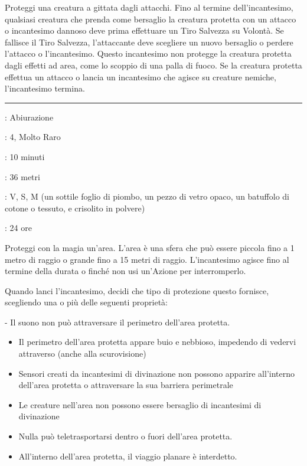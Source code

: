 \begin{multicols}{2}
Proteggi una creatura a gittata dagli attacchi. Fino al termine dell'incantesimo, qualsiasi creatura che prenda come bersaglio la creatura protetta con un attacco o incantesimo dannoso deve prima effettuare un Tiro Salvezza su Volontà. Se fallisce il Tiro Salvezza, l'attaccante deve scegliere un nuovo bersaglio o perdere l'attacco o l'incantesimo. Questo incantesimo non protegge la creatura protetta dagli effetti ad area, come lo scoppio di una palla di fuoco. Se la creatura protetta effettua un attacco o lancia un incantesimo che agisce su creature nemiche, l'incantesimo termina.

\smallskip\noindent\rule{\linewidth}{2pt} \hypertarget{Santuario Privato}{}\medskip{}
\noindent
\begin{description}[noitemsep, topsep=0pt, parsep=0pt, partopsep=0pt, leftmargin=0cm, labelwidth=2.8cm]
	\item[\textbf{Lista di Magia}]: Abiurazione
	\item[\textbf{Livello}]: 4, Molto Raro
	\item[\textbf{T. di Lancio}]: 10 minuti
	\item[\textbf{Gittata}]: 36 metri
	\item[\textbf{Componenti}]: V, S, M (un sottile foglio di piombo, un pezzo di vetro opaco, un batuffolo di cotone o tessuto, e crisolito in polvere)
	\item[\textbf{Durata}]: 24 ore
\end{description}

Proteggi con la magia un'area. L'area è una sfera che può essere piccola fino a 1 metro di raggio o grande fino a 15 metri di raggio. L'incantesimo agisce fino al termine della durata o finché non usi un'Azione per interromperlo.

Quando lanci l'incantesimo, decidi che tipo di protezione questo fornisce, scegliendo una o più delle seguenti proprietà:

\noindent- Il suono non può attraversare il perimetro dell'area protetta.

\begin{itemize}[leftmargin=*] \setlength{\itemsep}{0pt}
	\item Il perimetro dell'area protetta appare buio e nebbioso, impedendo di vedervi attraverso (anche alla scurovisione)
	\item Sensori creati da incantesimi di divinazione non possono apparire all'interno dell'area protetta o attraversare la sua barriera perimetrale
	\item Le creature nell'area non possono essere bersaglio di incantesimi di divinazione
	\item Nulla può teletrasportarsi dentro o fuori dell'area protetta.
	\item All'interno dell'area protetta, il viaggio planare è interdetto.
\end{itemize}


\end{multicols}
